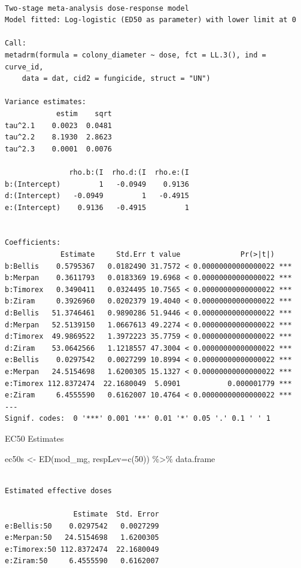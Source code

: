\documentclass[
  letterpaper,
  DIV=11,
  numbers=noendperiod]{scrreport}
\newenvironment{Shaded}{\begin{snugshade}}{\end{snugshade}}
\newcommand{\AttributeTok}[1]{\textcolor[rgb]{0.40,0.45,0.13}{#1}}
\newcommand{\DecValTok}[1]{\textcolor[rgb]{0.68,0.00,0.00}{#1}}
\newcommand{\FunctionTok}[1]{\textcolor[rgb]{0.28,0.35,0.67}{#1}}
\newcommand{\NormalTok}[1]{\textcolor[rgb]{0.00,0.23,0.31}{#1}}
\newcommand{\OtherTok}[1]{\textcolor[rgb]{0.00,0.23,0.31}{#1}}
\newcommand{\SpecialCharTok}[1]{\textcolor[rgb]{0.37,0.37,0.37}{#1}}
\begin{document}
\begin{verbatim}

Two-stage meta-analysis dose-response model
Model fitted: Log-logistic (ED50 as parameter) with lower limit at 0

Call:
metadrm(formula = colony_diameter ~ dose, fct = LL.3(), ind = curve_id, 
    data = dat, cid2 = fungicide, struct = "UN")

Variance estimates:
            estim    sqrt
tau^2.1    0.0023  0.0481
tau^2.2    8.1930  2.8623
tau^2.3    0.0001  0.0076

               rho.b:(I  rho.d:(I  rho.e:(I
b:(Intercept)         1   -0.0949    0.9136
d:(Intercept)   -0.0949         1   -0.4915
e:(Intercept)    0.9136   -0.4915         1


Coefficients:
             Estimate     Std.Err t value              Pr(>|t|)    
b:Bellis    0.5795367   0.0182490 31.7572 < 0.00000000000000022 ***
b:Merpan    0.3611793   0.0183369 19.6968 < 0.00000000000000022 ***
b:Timorex   0.3490411   0.0324495 10.7565 < 0.00000000000000022 ***
b:Ziram     0.3926960   0.0202379 19.4040 < 0.00000000000000022 ***
d:Bellis   51.3746461   0.9890286 51.9446 < 0.00000000000000022 ***
d:Merpan   52.5139150   1.0667613 49.2274 < 0.00000000000000022 ***
d:Timorex  49.9869522   1.3972223 35.7759 < 0.00000000000000022 ***
d:Ziram    53.0642566   1.1218557 47.3004 < 0.00000000000000022 ***
e:Bellis    0.0297542   0.0027299 10.8994 < 0.00000000000000022 ***
e:Merpan   24.5154698   1.6200305 15.1327 < 0.00000000000000022 ***
e:Timorex 112.8372474  22.1680049  5.0901           0.000001779 ***
e:Ziram     6.4555590   0.6162007 10.4764 < 0.00000000000000022 ***
---
Signif. codes:  0 '***' 0.001 '**' 0.01 '*' 0.05 '.' 0.1 ' ' 1
\end{verbatim}

EC50 Estimates

\begin{Shaded}
\begin{Highlighting}[]
\NormalTok{ec50s }\OtherTok{\textless{}{-}} \FunctionTok{ED}\NormalTok{(mod\_mg, }\AttributeTok{respLev=}\FunctionTok{c}\NormalTok{(}\DecValTok{50}\NormalTok{)) }\SpecialCharTok{\%\textgreater{}\%}\NormalTok{ data.frame}
\end{Highlighting}
\end{Shaded}

\begin{verbatim}

Estimated effective doses

                Estimate  Std. Error
e:Bellis:50    0.0297542   0.0027299
e:Merpan:50   24.5154698   1.6200305
e:Timorex:50 112.8372474  22.1680049
e:Ziram:50     6.4555590   0.6162007
\end{verbatim}
\end{document}
